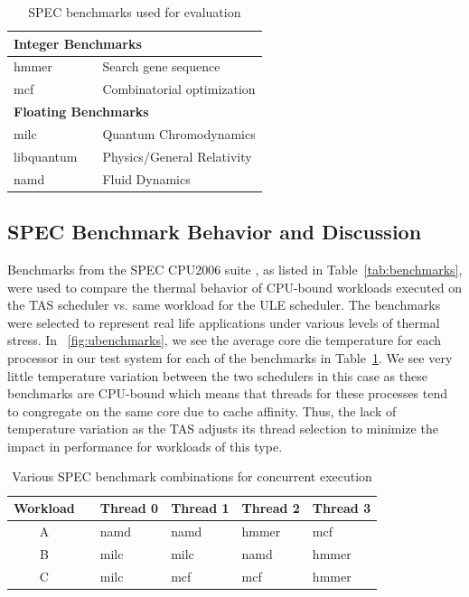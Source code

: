 \documentclass[times, 10pt,twocolumn]{IEEEtran}
\begin{document}
\begin{small}
\begin{table}[tbph]
\caption{SPEC benchmarks used for evaluation}
\label{tab:benchmarks} 
\centering
\begin{tabular}{l c p{5cm}} 
\hline 
\hline
\multicolumn{3}{l}{\textbf{Integer Benchmarks}}\\
\hline 
hmmer &  & Search gene sequence \\
mcf &  & Combinatorial optimization \\
\hline 
\hline
\multicolumn{3}{l}{\textbf{Floating Benchmarks}}\\ 
\hline 
milc &  & Quantum Chromodynamics \\
libquantum &  & Physics/General Relativity \\
namd &  & Fluid Dynamics \\
\hline
\end{tabular} %
\end{table}
\end{small}
\subsection{SPEC Benchmark Behavior and Discussion}
\label{sec:microarch} 
Benchmarks from the SPEC CPU2006 suite \cite{Spec2006}, as listed in
Table~\eqref{tab:benchmarks}, were used to compare the thermal behavior
of CPU-bound workloads executed on the TAS scheduler vs. same workload
for the ULE scheduler.  The benchmarks were selected to represent real
life applications under various levels of thermal stress.  In
\figurename~\ref{fig:ubenchmarks}, we see the average core die
temperature for each processor in our test system for each of the
benchmarks in Table~\ref{tab:benchmarks}.  We see very little
temperature variation between the two schedulers in this case as these
benchmarks are CPU-bound which means that threads for these processes
tend to congregate on the same core due to cache affinity.  Thus, the
lack of temperature variation as the TAS adjusts its thread selection to
minimize the impact in performance for workloads of this type.

\begin{small}
\begin{table}[bp]
\caption{Various SPEC benchmark combinations for concurrent execution}
\label{tab:crossbench} 
\centering
\begin{tabular}{clllll} 
\hline 
\hline 
Workload & & Thread 0 & Thread 1 &Thread 2 & Thread 3 \\ 
\hline 
A & & namd & namd & hmmer & mcf \\
B & & milc & milc & namd & hmmer \\ 
C & & milc & mcf & mcf & hmmer \\
\hline
\end{tabular}
\end{table}
\end{small}
\end{document}
